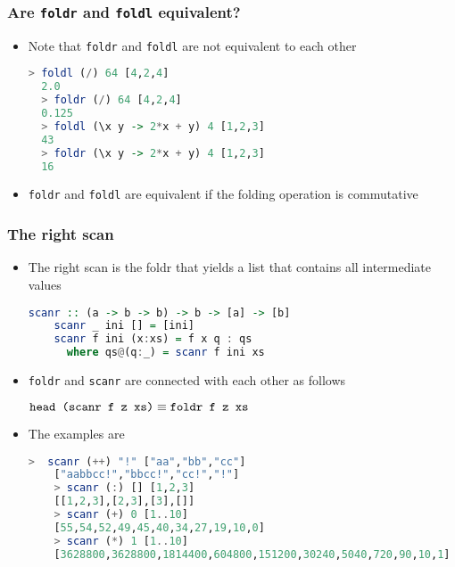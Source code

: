 \documentclass[10pt,pdf,utf8,russian,aspectratio=169]{beamer}
\begin{document}
\begin{frame}[fragile]
  \frametitle{Are \verb"foldr" and \verb"foldl" equivalent?}

\begin{itemize}
  \item Note that \verb"foldr" and \verb"foldl" are not equivalent to each other
  \begin{lstlisting}[language=Haskell]
  > foldl (/) 64 [4,2,4]
  2.0
  > foldr (/) 64 [4,2,4]
  0.125
  > foldl (\x y -> 2*x + y) 4 [1,2,3]
  43
  > foldr (\x y -> 2*x + y) 4 [1,2,3]
  16
  \end{lstlisting}
  \item \verb"foldr" and \verb"foldl" are equivalent if the folding operation is commutative
\end{itemize}
\end{frame}

\begin{frame}[fragile]
  \frametitle{The right scan}
  \begin{itemize}
    \item The right scan is the foldr that yields a list that contains all intermediate values
    \begin{lstlisting}[language=Haskell]
    scanr :: (a -> b -> b) -> b -> [a] -> [b]
    scanr _ ini [] = [ini]
    scanr f ini (x:xs) = f x q : qs
      where qs@(q:_) = scanr f ini xs
    \end{lstlisting}
    \item \verb"foldr" and \verb"scanr" are connected with each other as follows
    \begin{center}
      $\verb"head (scanr f z xs)" \equiv \verb"foldr f z xs"$
    \end{center}
    \item The examples are
    \begin{lstlisting}[language=Haskell]
    >  scanr (++) "!" ["aa","bb","cc"]
    ["aabbcc!","bbcc!","cc!","!"]
    > scanr (:) [] [1,2,3]
    [[1,2,3],[2,3],[3],[]]
    > scanr (+) 0 [1..10]
    [55,54,52,49,45,40,34,27,19,10,0]
    > scanr (*) 1 [1..10]
    [3628800,3628800,1814400,604800,151200,30240,5040,720,90,10,1]
    \end{lstlisting}
  \end{itemize}
\end{frame}
\end{document}
